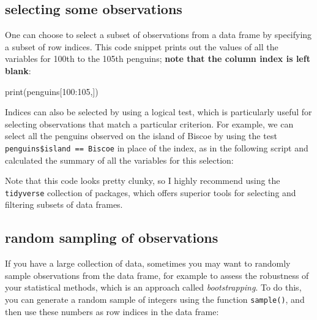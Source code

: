 \documentclass[
  letterpaper,
  DIV=11,
  numbers=noendperiod]{scrreprt}
\newenvironment{Shaded}{\begin{snugshade}}{\end{snugshade}}
\newcommand{\NormalTok}[1]{\textcolor[rgb]{0.00,0.23,0.31}{#1}}
\begin{document}
\hypertarget{selecting-some-observations}{%
\subsection*{selecting some
observations}\label{selecting-some-observations}}

One can choose to select a subset of observations from a data frame by
specifying a subset of row indices. This code snippet prints out the
values of all the variables for 100th to the 105th penguins;
\textbf{note that the column index is left blank}:

\begin{Shaded}
\begin{Highlighting}[]
\NormalTok{print(penguins[100:105,])}
\end{Highlighting}
\end{Shaded}

Indices can also be selected by using a logical test, which is
particularly useful for selecting observations that match a particular
criterion. For example, we can select all the penguins observed on the
island of Biscoe by using the test
\texttt{penguins\$island\ ==\ \textquotesingle{}Biscoe\textquotesingle{}}
in place of the index, as in the following script and calculated the
summary of all the variables for this selection:

\begin{Shaded}
\end{Shaded}

Note that this code looks pretty clunky, so I highly recommend using the
\texttt{tidyverse} collection of packages, which offers superior tools
for selecting and filtering subsets of data frames.

\hypertarget{random-sampling-of-observations}{%
\subsection*{random sampling of
observations}\label{random-sampling-of-observations}}

If you have a large collection of data, sometimes you may want to
randomly sample observations from the data frame, for example to assess
the robustness of your statistical methods, which is an approach called
\emph{bootstrapping}. To do this, you can generate a random sample of
integers using the function \texttt{sample()}, and then use these
numbers as row indices in the data frame:
\end{document}
